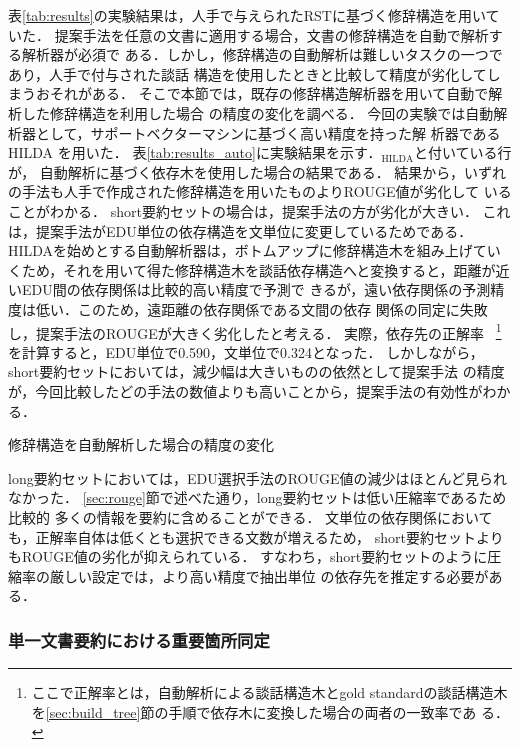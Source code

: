 \documentclass[japanese]{jnlp_1.4}
\begin{document}
表\ref{tab:results}の実験結果は，人手で与えられたRSTに基づく修辞構造を用いていた．
提案手法を任意の文書に適用する場合，文書の修辞構造を自動で解析する解析器が必須で
ある．しかし，修辞構造の自動解析は難しいタスクの一つであり，人手で付与された談話
構造を使用したときと比較して精度が劣化してしまうおそれがある．
そこで本節では，既存の修辞構造解析器を用いて自動で解析した修辞構造を利用した場合
の精度の変化を調べる．
今回の実験では自動解析器として，サポートベクターマシンに基づく高い精度を持った解
析器であるHILDA \cite{duverle09,hilda}を用いた．
表\ref{tab:results_auto}に実験結果を示す．$_\text{HILDA}$と付いている行が，
自動解析に基づく依存木を使用した場合の結果である．
結果から，いずれの手法も人手で作成された修辞構造を用いたものよりROUGE値が劣化して
いることがわかる．
short要約セットの場合は，提案手法の方が劣化が大きい．
これは，提案手法がEDU単位の依存構造を文単位に変更しているためである．
HILDAを始めとする自動解析器は，ボトムアップに修辞構造木を組み上げていくため，それを用いて得た修辞構造木を談話依存構造へと変換すると，距離が近いEDU間の依存関係は比較的高い精度で予測で
きるが，遠い依存関係の予測精度は低い．このため，遠距離の依存関係である文間の依存
関係の同定に失敗し，提案手法のROUGEが大きく劣化したと考える．
実際，依存先の正解率
~\footnote{ここで正解率とは，自動解析による談話構造木とgold standardの談話構造木
を\protect \ref{sec:build_tree}節の手順で依存木に変換した場合の両者の一致率であ
る．}
を計算すると，EDU単位で0.590，文単位で0.324となった．
しかしながら，short要約セットにおいては，減少幅は大きいものの依然として提案手法
の精度が，今回比較したどの手法の数値よりも高いことから，提案手法の有効性がわかる．

\begin{table}[b]
\caption{修辞構造を自動解析した場合の精度の変化}
\label{tab:results_auto}

\vspace{-1\Cvs}
\end{table}

long要約セットにおいては，EDU選択手法のROUGE値の減少はほとんど見られなかった．
\ref{sec:rouge}節で述べた通り，long要約セットは低い圧縮率であるため比較的
多くの情報を要約に含めることができる．
文単位の依存関係においても，正解率自体は低くとも選択できる文数が増えるため，
short要約セットよりもROUGE値の劣化が抑えられている．
すなわち，short要約セットのように圧縮率の厳しい設定では，より高い精度で抽出単位
の依存先を推定する必要がある．

\subsubsection{単一文書要約における重要箇所同定}
\end{document}
